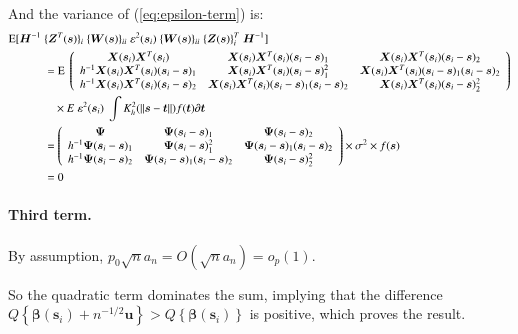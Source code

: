 \documentclass[authoryear, review, 11pt]{elsarticle}
\begin{document}
    
    And the variance of (\ref{eq:epsilon-term}) is:
    \begin{align}
      \text{E} [ \bm{H}^{-1} \; &\{ \bm{Z}^T(\bm{s}) \}_i \; \{ \bm{W}(\bm{s}) \}_{ii} \; \varepsilon^2(\bm{s}_i) \; \{ \bm{W}(\bm{s}) \}_{ii} \; \{ \bm{Z}(\bm{s}) \}^T_i \;   \bm{H}^{-1} ] \notag \\
      &= \text{E} \; \left( \begin{array}{ccc} \bm{X}(\bm{s}_i) \bm{X}^T(\bm{s}_i) & \bm{X}(\bm{s}_i) \bm{X}^T(\bm{s}_i) (\bm{s}_i - \bm{s})_1 & \bm{X}(\bm{s}_i) \bm{X}^T(\bm{s}_i) (\bm{s}_i - \bm{s})_2 \\ h^{-1} \bm{X}(\bm{s}_i) \bm{X}^T(\bm{s}_i) (\bm{s}_i - \bm{s})_1 & \bm{X}(\bm{s}_i) \bm{X}^T(\bm{s}_i) (\bm{s}_i - \bm{s})^2_1 & \bm{X}(\bm{s}_i) \bm{X}^T(\bm{s}_i) (\bm{s}_i - \bm{s})_1 (\bm{s}_i - \bm{s})_2 \\ h^{-1} \bm{X}(\bm{s}_i) \bm{X}^T(\bm{s}_i) (\bm{s}_i - \bm{s})_2 & \bm{X}(\bm{s}_i) \bm{X}^T(\bm{s}_i) (\bm{s}_i - \bm{s})_1 (\bm{s}_i - \bm{s})_2 & \bm{X}(\bm{s}_i) \bm{X}^T(\bm{s}_i) (\bm{s}_i - \bm{s})^2_2 \end{array} \right)  \notag \\
      & \:\:\:\: \times E \; \varepsilon^2(\bm{s}_i) \; \int K^2_h(\| \bm{s} - \bm{t} \|) f(\bm{t}) \partial \bm{t} \notag \\
      &= \left( \begin{array}{ccc} \bm{\Psi} & \bm{\Psi} (\bm{s}_i - \bm{s})_1 & \bm{\Psi} (\bm{s}_i - \bm{s})_2 \\ h^{-1} \bm{\Psi} (\bm{s}_i - \bm{s})_1 & \bm{\Psi} (\bm{s}_i - \bm{s})^2_1 & \bm{\Psi} (\bm{s}_i - \bm{s})_1 (\bm{s}_i - \bm{s})_2 \\ h^{-1} \bm{\Psi} (\bm{s}_i - \bm{s})_2 & \bm{\Psi} (\bm{s}_i - \bm{s})_1 (\bm{s}_i - \bm{s})_2 & \bm{\Psi} (\bm{s}_i - \bm{s})^2_2 \end{array} \right) \times \sigma^2 \times f(\bm{s})  \notag \\
      &= 0
    \end{align}
  
  \paragraph{Third term.} By assumption, $p_0 \sqrt{n} a_n = O(\sqrt{n} a_n) = o_p(1)$.
  
  So the quadratic term dominates the sum, implying that the difference $Q \left\{ \bm{\beta}(\bm{s}_i) + n^{-1/2} \bm{u} \right\} > Q \left\{ \bm{\beta}(\bm{s}_i) \right\}$ is positive, which proves the result.
  
\end{document}
